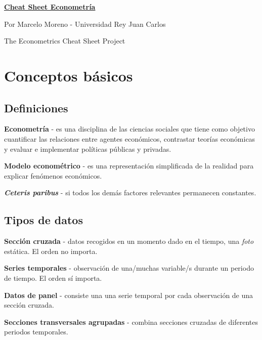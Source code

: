 \documentclass[10pt, a4paper, landscape]{extarticle}
\begin{document}
\setlength{\footskip}{12pt}

\begin{multicols}{3}

\begin{center}
	\textbf{\LARGE \href{https://github.com/marcelomijas/econometrics-cheatsheet}{Cheat Sheet Econometría}}
	
	{\footnotesize Por Marcelo Moreno - Universidad Rey Juan Carlos}
	
	{\footnotesize The Econometrics Cheat Sheet Project}
\end{center}

\section*{Conceptos básicos}

\subsection*{Definiciones}

\textbf{Econometría} - es una disciplina de las ciencias sociales que tiene como objetivo cuantificar las relaciones entre agentes económicos, contrastar teorías económicas y evaluar e implementar políticas públicas y privadas.

\textbf{Modelo econométrico} - es una representación simplificada de la realidad para explicar fenómenos económicos.

\textbf{\textsl{Ceteris paribus}} - si todos los demás factores relevantes permanecen constantes.

\subsection*{Tipos de datos}

\textbf{Sección cruzada} - datos recogidos en un momento dado en el tiempo, una \textsl{foto} estática. El orden no importa.

\textbf{Series temporales} - observación de una/muchas variable/s durante un periodo de tiempo. El orden sí importa.

\textbf{Datos de panel} - consiste una una serie temporal por cada observación de una sección cruzada.

\textbf{Secciones transversales agrupadas} - combina secciones cruzadas de diferentes periodos temporales.


\end{multicols}
\end{document}
